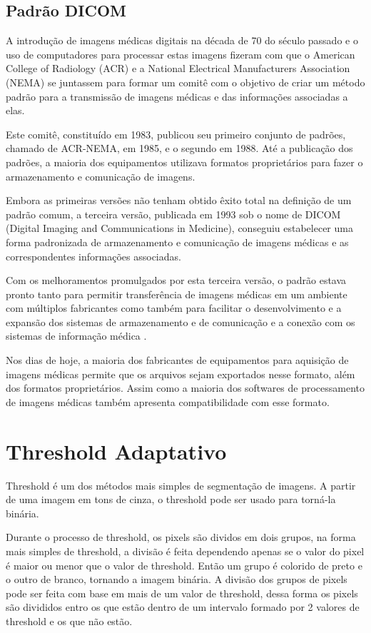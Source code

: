 \subsection{Padrão DICOM}

A introdução de imagens médicas digitais na década de 70 do século passado e o uso de computadores para processar estas imagens fizeram com que o American College of Radiology (ACR) e a National Electrical Manufacturers Association (NEMA) se juntassem para formar um comitê com o objetivo de criar um método padrão para a transmissão de imagens médicas e das informações associadas a elas.

Este comitê, constituído em 1983, publicou seu primeiro conjunto de padrões, chamado de ACR-NEMA, em 1985, e o segundo em 1988. Até a publicação dos padrões, a maioria dos equipamentos utilizava formatos proprietários para fazer o armazenamento e comunicação de imagens.

Embora as primeiras versões não tenham obtido êxito total na definição de um padrão comum, a terceira versão, publicada em 1993 sob o nome de DICOM (Digital Imaging and Communications in Medicine), conseguiu estabelecer uma forma padronizada de armazenamento e comunicação de imagens médicas e as correspondentes informações associadas.

Com os melhoramentos promulgados por esta terceira versão, o padrão estava pronto tanto para permitir transferência de imagens médicas em um ambiente com múltiplos fabricantes como também para facilitar o desenvolvimento e a expansão dos sistemas de armazenamento e de comunicação e a conexão com os sistemas de informação médica \cite{nema}.

Nos dias de hoje, a maioria dos fabricantes de equipamentos para aquisição de imagens médicas permite que os arquivos sejam exportados nesse formato, além dos formatos proprietários. Assim como a maioria dos softwares de processamento de imagens médicas também apresenta compatibilidade com esse formato.

\section{Threshold Adaptativo}

Threshold é um dos métodos mais simples de segmentação de imagens. A partir de uma imagem em tons de cinza, o threshold pode ser usado para torná-la binária.

Durante o processo de threshold, os pixels são dividos em dois grupos, na forma mais simples de threshold, a divisão é feita dependendo apenas se o valor do pixel é maior ou menor que o valor de threshold. Então um grupo é colorido de preto e o outro de branco, tornando a imagem binária. A divisão dos grupos de pixels pode ser feita com base em mais de um valor de threshold, dessa forma os pixels são divididos entro os que estão dentro de um intervalo formado por 2 valores de threshold e os que não estão.

